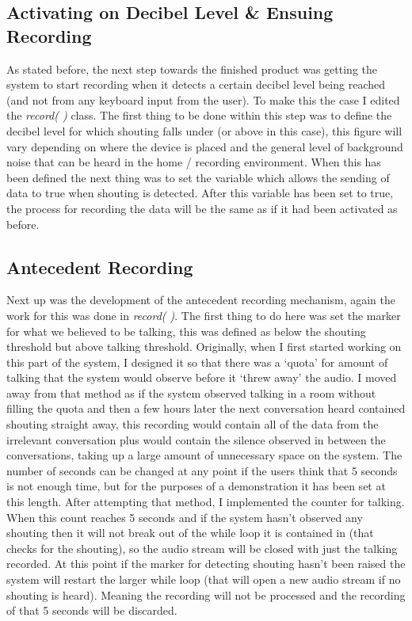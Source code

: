 \documentclass[a4paper,11pt]{report}
\begin{document}
\subsection{Activating on Decibel Level \& Ensuing Recording}
As stated before, the next step towards the finished product was getting the system to start recording when it detects a certain decibel level being reached (and not from any keyboard input from the user). To make this the case I edited the \textit{record( )} class. The first thing to be done within this step was to define the decibel level for which shouting falls under (or above in this case), this figure will vary depending on where the device is placed and the general level of background noise that can be heard in the home / recording environment. When this has been defined the next thing was to set the variable which allows the sending of data to true when shouting is detected. After this variable has been set to true, the process for recording the data will be the same as if it had been activated as before.

\subsection{Antecedent Recording}
Next up was the development of the antecedent recording mechanism, again the work for this was done in \textit{record( )}. The first thing to do here was set the marker for what we believed to be talking, this was defined as below the shouting threshold but above talking threshold. Originally, when I first started working on this part of the system, I designed it so that there was a ‘quota’ for amount of talking that the system would observe before it ‘threw away’ the audio. I moved away from that method as if the system observed talking in a room without filling the quota and then a few hours later the next conversation heard contained shouting straight away, this recording would contain all of the data from the irrelevant conversation plus would contain the silence observed in between the conversations, taking up a large amount of unnecessary space on the system. The number of seconds can be changed at any point if the users think that 5 seconds is not enough time, but for the purposes of a demonstration it has been set at this length. After attempting that method, I implemented the counter for talking. When this count reaches 5 seconds and if the system hasn’t observed any shouting then it will not break out of the while loop it is contained in (that checks for the shouting), so the audio stream will be closed with just the talking recorded. At this point if the marker for detecting shouting hasn’t been raised the system will restart the larger while loop (that will open a new audio stream if no shouting is heard). Meaning the recording will not be processed and the recording of that 5 seconds will be discarded.
\end{document}
